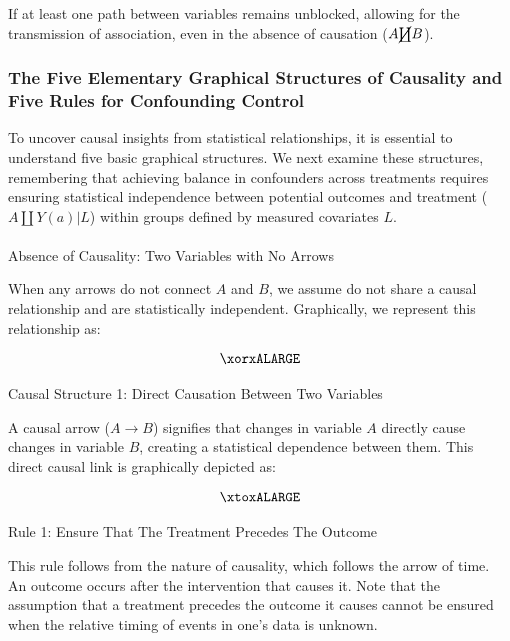 \documentclass[
  singlecolumn]{article}
\makeatletter
\let\oldparagraph\paragraph
\renewcommand{\paragraph}{
    \@ifstar
      \xxxParagraphStar
      \xxxParagraphNoStar
  }
\newcommand{\xxxParagraphStar}[1]{\oldparagraph*{#1}\mbox{}}
\newcommand{\xxxParagraphNoStar}[1]{\oldparagraph{#1}\mbox{}}
\makeatother
\begin{document}
If at least one path between variables remains unblocked, allowing for
the transmission of association, even in the absence of causation
(\(A \cancel\coprod B\)).

\subsubsection{The Five Elementary Graphical Structures of Causality and
Five Rules for Confounding Control}\label{sec-five-elementary}

To uncover causal insights from statistical relationships, it is
essential to understand five basic graphical structures. We next examine
these structures, remembering that achieving balance in confounders
across treatments requires ensuring statistical independence between
potential outcomes and treatment (\(A\coprod Y(a)|L\)) within groups
defined by measured covariates \(L\).

\paragraph{Absence of Causality: Two Variables with No
Arrows}\label{absence-of-causality-two-variables-with-no-arrows}

When any arrows do not connect \(A\) and \(B\), we assume do not share a
causal relationship and are statistically independent. Graphically, we
represent this relationship as:

\[\xorxALARGE\]

\paragraph{Causal Structure 1: Direct Causation Between Two
Variables}\label{causal-structure-1-direct-causation-between-two-variables}

A causal arrow (\(A \to B\)) signifies that changes in variable \(A\)
directly cause changes in variable \(B\), creating a statistical
dependence between them. This direct causal link is graphically depicted
as:

\[\xtoxALARGE\]

\paragraph{Rule 1: Ensure That The Treatment Precedes The
Outcome}\label{sec-four-rules}

This rule follows from the nature of causality, which follows the arrow
of time. An outcome occurs after the intervention that causes it. Note
that the assumption that a treatment precedes the outcome it causes
cannot be ensured when the relative timing of events in one's data is
unknown.
\end{document}
